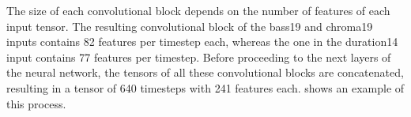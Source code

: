 
The size of each convolutional block depends on the number
of features of each input tensor. The resulting
convolutional block of the \gls{bass19} and \gls{chroma19}
inputs contains 82 features per timestep each, whereas the
one in the \gls{duration14} input contains 77 features per
timestep. Before proceeding to the next layers of the neural
network, the tensors of all these convolutional blocks are
concatenated, resulting in a tensor of 640 timesteps with
241 features each.  shows an
example of this process.


